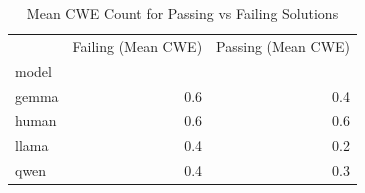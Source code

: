 \begin{table}[htbp]
\caption{Mean CWE Count for Passing vs Failing Solutions}
\label{tab:cwe_status}
\begin{tabular}{lrr}
\toprule
 & Failing (Mean CWE) & Passing (Mean CWE) \\
model &  &  \\
\midrule
gemma & 0.6 & 0.4 \\
human & 0.6 & 0.6 \\
llama & 0.4 & 0.2 \\
qwen & 0.4 & 0.3 \\
\bottomrule
\end{tabular}
\end{table}
